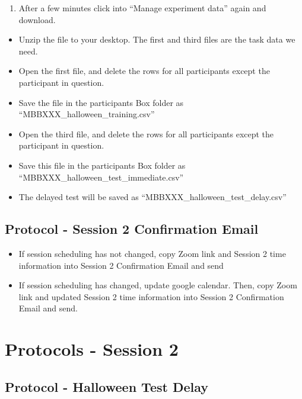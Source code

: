 \documentclass[]{book}
\providecommand{\tightlist}{%
  \setlength{\itemsep}{0pt}\setlength{\parskip}{0pt}}
\begin{document}
\begin{enumerate}
\def\labelenumi{\arabic{enumi}.}
\setcounter{enumi}{4}
\tightlist
\item
  After a few minutes click into ``Manage experiment data'' again and download.
\end{enumerate}

\begin{itemize}
\tightlist
\item
  Unzip the file to your desktop. The first and third files are the task data we need.
\item
  Open the first file, and delete the rows for all participants except the participant in question.
\item
  Save the file in the participants Box folder as ``MBBXXX\_halloween\_training.csv''
\item
  Open the third file, and delete the rows for all participants except the participant in question.
\item
  Save this file in the participants Box folder as ``MBBXXX\_halloween\_test\_immediate.csv''
\item
  The delayed test will be saved as ``MBBXXX\_halloween\_test\_delay.csv''
\end{itemize}

\hypertarget{protocol---session-2-confirmation-email}{%
\subsection{Protocol - Session 2 Confirmation Email}\label{protocol---session-2-confirmation-email}}

\begin{itemize}
\tightlist
\item
  If session scheduling has not changed, copy Zoom link and Session 2 time information into Session 2 Confirmation Email and send
\item
  If session scheduling has changed, update google calendar. Then, copy Zoom link and updated Session 2 time information into Session 2 Confirmation Email and send.
\end{itemize}

\hypertarget{protocols---session-2}{%
\section{Protocols - Session 2}\label{protocols---session-2}}

\hypertarget{protocol---halloween-test-delay}{%
\subsection{Protocol - Halloween Test Delay}\label{protocol---halloween-test-delay}}
\end{document}

